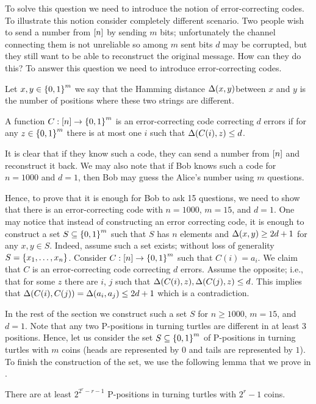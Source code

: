 To solve this question we need to introduce the notion of error-correcting
codes. To illustrate this notion consider completely different scenario.
Two people wish to send a number from ${[{n}]}$ by sending $m$ bits;
unfortunately the channel connecting them is not unreliable so among $m$ sent
bits $d$ may be corrupted, but they still want to be able to reconstruct the
original message. How can they do this? To answer this question we need to
introduce error-correcting codes.
\begin{definition}
  Let $x, y \in \set{0, 1}^m$ we say that the Hamming distance 
  $\Delta({x}, {y})$between $x$ and
  $y$ is the number of positions where these two strings are different.

  A function $C : \range{n} \to \set{0, 1}^m$ is an error-correcting code
  correcting $d$ errors if for any $z \in \set{0, 1}^m$ there is at most one 
  $i$ such that $\Delta({C(i)}, {z}) \le d$.
\end{definition}
It is clear that if they know such a code, they can send a number from
${[{n}]}$ and reconstruct it back. We may also note that if Bob knows such a
code for $n = 1000$ and $d = 1$, then Bob may guess the Alice's number using $m$
questions.


Hence, to prove that it is enough for Bob to ask 15 questions, we need to show
that there is an error-correcting code with $n = 1000$, $m = 15$, and $d = 1$.
One may notice that instead of constructing an error correcting code, it is
enough to construct a set $S \subseteq \set{0, 1}^m$ such that $S$ has $n$
elements and $\Delta({x}, {y}) \ge 2d + 1$ for any $x, y \in S$. Indeed, assume
such a set exists; without loss of generality $S = \set{x_1, \dots, x_n}$.
Consider $C : \range{n} \to \set{0, 1}^m$ such that $C(i) = a_i$. We claim that
$C$ is an error-correcting code correcting $d$ errors. Assume the opposite;
i.e., that for some $z$ there are $i$, $j$ such that 
$\Delta({C(i)}, {z}), \Delta({C(j)}, {z}) \le d$. This implies that 
$\Delta({C(i)}, {C(j)}) = \Delta({a_i}, {a_j}) \le 2d + 1$ which is a
contradiction.


In the rest of the section we construct such a set $S$ for $n \ge 1000$, $m =
15$, and $d = 1$. Note that any two P-positions in turning turtles are different
in at least $3$ positions. Hence, let us consider the set 
$S \subseteq \set{0, 1}^m$ of P-positions in turning turtles with $m$ coins
(heads are represented by $0$ and tails are represented by $1$). To finish the
construction of the set, we use the following lemma that we prove in
.
\begin{lemma}
\label{lemma:turning-turtles-number-P}
  There are at least $2^{2^r - r - 1}$ P-positions in turning turtles with 
  $2^r - 1$ coins.
\end{lemma}

